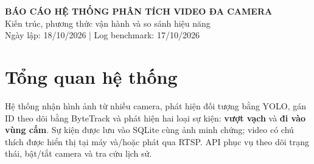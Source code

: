\documentclass[11pt,a4paper]{article}
\begin{document}
\thispagestyle{plain}
\begin{center}
  {\Large\bfseries\color{ink}
    BÁO CÁO HỆ THỐNG PHÂN TÍCH VIDEO ĐA CAMERA}\\[5pt]
  {\normalsize Kiến trúc, phương thức vận hành và so sánh hiệu năng}\\[3pt]
  {\small Ngày lập: 18/10/2026 \quad | \quad Log benchmark: 17/10/2026}
\end{center}

\section{Tổng quan hệ thống}
Hệ thống nhận hình ảnh từ nhiều camera, phát hiện đối tượng bằng YOLO,
gán ID theo dõi bằng ByteTrack và phát hiện hai loại sự kiện:
\textbf{vượt vạch} và \textbf{đi vào vùng cấm}.
Sự kiện được lưu vào SQLite cùng ảnh minh chứng; video có chú thích được
hiển thị tại máy và/hoặc phát qua RTSP. API phục vụ theo dõi trạng thái,
bật/tắt camera và tra cứu lịch sử.
\end{document}
